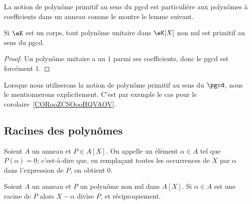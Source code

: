 La notion de polynôme primitif au sens du pgcd est particulière aux polynômes à coefficients dans un anneau comme le montre le lemme suivant.

\begin{lemma}
	Si \( \eK\) est un corps, tout polynôme unitaire dans \( \eK[X]\) non nul est primitif au sens du pgcd.
\end{lemma}

\begin{proof}
	Un polynôme unitaire a un \( 1\) parmi ses coefficients, donc le pgcd est forcément \( 1\).
\end{proof}

Lorsque nous utiliserons la notion de polynôme primitif au sens du \( \pgcd\), nous le mentionnerons explicitement. C'est par exemple le cas pour le corolaire~\ref{CORooZCSOooHQVAOV}.

\subsection{Racines des polynômes}

\begin{definition}
	Soient \( A \) un anneau et \( P \in A[X] \). On appelle
	 un élément \( \alpha \in A \)
	tel que \( P(\alpha) = 0 \); c'est-à-dire que, en remplaçant toutes
	les occurrences de \( X\) par \( \alpha\) dans l'expression de \( P\), on
	obtient \( 0\).
\end{definition}

\begin{proposition} \label{PropHSQooASRbeA}
	Soient \( A\) un anneau et \( P\) un polynôme non nul dans \( A[X]\). Si \( \alpha\in A\) est une racine de \( P\) alors \( X-\alpha\) divise \( P\), et réciproquement.
\end{proposition}


